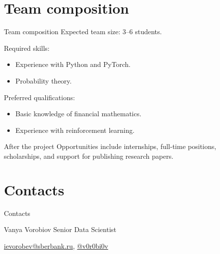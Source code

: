 \documentclass[10pt]{beamer}
\begin{document}
    \section{Team composition}
    \begin{frame}{Team composition}
        Expected team size: 3–6 students.
        
        Required skills:
        \begin{itemize}
            \item Experience with Python and PyTorch.
            \item Probability theory.
        \end{itemize}

        Preferred qualifications:
        \begin{itemize}
            \item Basic knowledge of financial mathematics.
            \item Experience with reinforcement learning.
        \end{itemize}

        \begin{block}{After the project}
            Opportunities include internships, full-time positions, scholarships, and support for publishing research papers.
        \end{block}
    \end{frame}

    \section{Contacts}
    \begin{frame}{Contacts}
        \begin{block}{Vanya Vorobiov}
            Senior Data Scientist
            
            \href{mailto:ievorobev@sberbank.ru}{ievorobev@sberbank.ru}, \href{https://t.me/v0r0bi0v}{@v0r0bi0v}
        \end{block}
    \end{frame}
\end{document}
